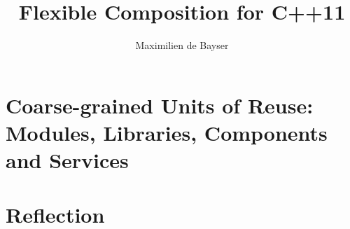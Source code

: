 \documentclass[msc,twoside,british]{ThesisPUC_uk}
\author{Maximilien de Bayser}
\title{Flexible Composition for C++11}
\begin{document}

\chapter{Coarse-grained Units of Reuse: Modules, Libraries, Components and Services}


\chapter{Reflection}






\end{document}
